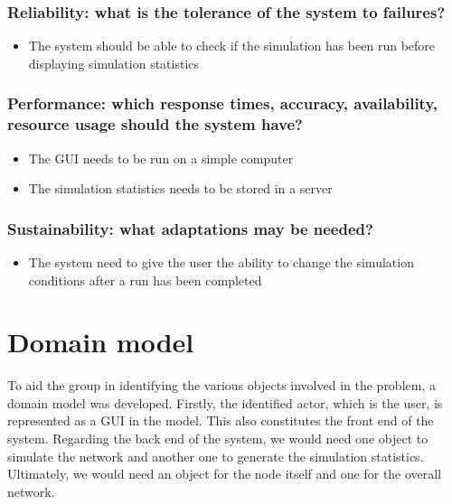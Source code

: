 \subsubsection{Reliability: what is the tolerance of the system to failures?}
\begin{itemize}
  \item The system should be able to check if the simulation has been run before displaying simulation statistics
\end{itemize}

\subsubsection{Performance: which response times, accuracy, availability, resource usage should the system have?}

\begin{itemize}
    \item The GUI needs to be run on a simple computer
    \item The simulation statistics needs to be stored in a server
\end{itemize}

\subsubsection{Sustainability: what adaptations may be needed?}
\begin{itemize}
    \item The system need to give the user the ability to change the simulation conditions after a run has been completed
\end{itemize}

\section{Domain model}
To aid the group in identifying the various objects involved in the problem, a domain model was developed. Firstly, the identified actor, which is the user, is represented as a GUI in the model. This also constitutes the front end of the system. Regarding the back end of the system, we would need one object to simulate the network and another one to generate the simulation statistics. Ultimately, we would need an object for the node itself and one for the overall network.


